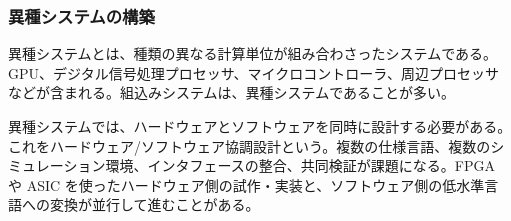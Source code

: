 \subsubsection{異種システムの構築}

異種システムとは、種類の異なる計算単位が組み合わさったシステムである。GPU、デジタル信号処理プロセッサ、マイクロコントローラ、周辺プロセッサなどが含まれる。組込みシステムは、異種システムであることが多い。

異種システムでは、ハードウェアとソフトウェアを同時に設計する必要がある。これをハードウェア/ソフトウェア協調設計という。複数の仕様言語、複数のシミュレーション環境、インタフェースの整合、共同検証が課題になる。FPGA や ASIC を使ったハードウェア側の試作・実装と、ソフトウェア側の低水準言語への変換が並行して進むことがある。
